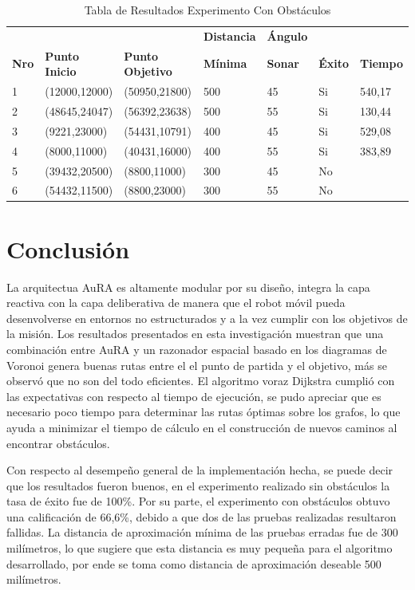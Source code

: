 \documentclass[11pt,twoside,A5]{article}
\begin{document}
\begin{table}[h]
\centering
\caption{Tabla de Resultados Experimento Con Obstáculos}
\label{tab:experimento-2}
\tiny
\begin{tabular}{|l|l|l|l|l|l|l|} \hline
&&&\textbf{Distancia}&\textbf{Ángulo}&& \\ 
\textbf{Nro}&\textbf{Punto Inicio}&\textbf{Punto Objetivo}&\textbf{Mínima}&\textbf{Sonar}&\textbf{Éxito}&\textbf{Tiempo} \\ \hline
1&(12000,12000)&(50950,21800)&500&45&Si&540,17 \\ \hline
2&(48645,24047)&(56392,23638)&500&55&Si&130,44 \\ \hline
3&(9221,23000)&(54431,10791)&400&45&Si&529,08 \\ \hline
4&(8000,11000)&(40431,16000)&400&55&Si&383,89 \\ \hline
5&(39432,20500)&(8800,11000)&300&45&No&\\ \hline
6&(54432,11500)&(8800,23000)&300&55&No&\\ \hline
\end{tabular}
\end{table}

\section*{Conclusión}

La arquitectua AuRA es altamente modular por su diseño, integra la capa reactiva con 
la capa deliberativa de manera que el robot móvil pueda desenvolverse en 
entornos no estructurados y a la vez cumplir con los objetivos de la misión. Los resultados
presentados en esta investigación muestran que una combinación entre AuRA y
un razonador espacial basado en los diagramas de Voronoi genera buenas rutas entre el 
el punto de partida y el objetivo, más se observó que no son del todo eficientes.
El algoritmo voraz Dijkstra  cumplió con las expectativas con respecto al 
tiempo de ejecución, se pudo apreciar que es necesario poco tiempo para determinar
las rutas óptimas sobre los grafos, lo que ayuda 
a minimizar el tiempo de cálculo en el construcción
de nuevos caminos al encontrar obstáculos.

Con respecto al desempeño general de la implementación hecha, se puede decir que los resultados 
fueron buenos, en el experimento realizado sin obstáculos la tasa de éxito fue de 100\%.
Por su parte, el experimento con obstáculos obtuvo una calificación de 66,6\%, debido a que dos
de las pruebas realizadas resultaron fallidas. La distancia de aproximación mínima de las pruebas erradas
fue de 300 milímetros, lo que sugiere que esta distancia es muy pequeña para el algoritmo desarrollado, por ende se toma como
distancia de aproximación deseable 500 milímetros.
\end{document}
